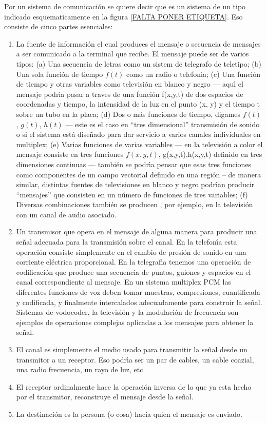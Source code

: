 Por un sistema de comunicaci\'{o}n se quiere decir que es un sistema
de un tipo indicado esquematicamente en la figura \ref{FALTA PONER
ETIQUETA}. Eso consiste de cinco partes esenciales:
\begin{enumerate}
\item{La fuente de informaci\'{o}n el cual produces el mensaje o secuencia de
mensajes a ser comunicado a la terminal que recibe. El mensaje puede
ser de varios tipos: (a) Una secuencia de letras como un sistem de
telegrafo de teletipo; (b) Una sola funci\'{o}n de tiempo $f(t)$ como
un radio o telefon\'{\i}a; (c) Una funci\'{o}n de tiempo y otras
variables como televisi\'{o}n en blanco y negro --- aqu\'{\i} el
mensaje podr\'{\i}a pasar a traves de una funci\'{o}n f(x,y,t) de dos
espacios de coordenadas y tiempo, la intensidad de la luz en el punto
(x, y) y el tiempo t sobre un tubo en la placa; (d) Dos o m\'{a}s
funciones de tiempo, digames $f(t)$, $g(t)$, $h(t)$ --- este es el
caso en ``tres dimensional'' transmisi\'{o}n de sonido o si el sistema
est\'{a} dise\~{n}ado para dar servicio a varios canales individuales
en multiplex; (e) Varias funciones de varias variables --- en la
televisi\'{o}n a color el mensaje consiste en tres funciones $f(x,y,t)$,
g(x,y,t),h(x,y,t) definido en tres dimensiones continuas --- tambi\'{e}n se
podr\'{\i}a pensar que esas tres funciones como componentes de un
campo vectorial definido en una regi\'{o}n -- de manera similar,
distintas fuentes de televisiones en blanco y negro podr\'{\i}an
producir ``mensajes'' que consisten en un n\'{u}mero de funciones de
tres variables; (f) Diversas combinaciones tambi\'{e}n se producen , por
ejemplo, en la televisi\'{o}n con un canal de audio asociado.}
\item{Un transmisor que opera en el mensaje de alguna manera para
producir una se\~{n}al adecuada para la transmisi\'{o}n sobre el
canal. En la telefon\'{\i}a esta operaci\'{o}n consiste simplemente en
el cambio de presi\'{o}n de sonido en una corriente el\'{e}ctrica
proporcional. En la telegraf\'{\i}a tenemos una operaci\'{o}n de
codificaci\'{o}n que produce una secuencia de puntos, guiones y
espacios en el canal correspondiente al mensaje. En un sistema
multiplex PCM las diferentes funciones de voz deben tomar muestras,
compresiones, cuantificada y codificada, y finalmente intercalados
adecuadamente para construir la se\~{n}al. Sistemas de vodocoder, la
televisi\'{o}n y la modulaci\'{o}n de frecuencia son ejemplos de
operaciones complejas aplicadas a los mensajes para obtener la
se\~{n}al.}
\item{El canal es simplemente el medio usado para transmitir la se\~{n}al
desde un transmitor a un receptor. Eso podr\'{\i}a ser un par de
cables, un cable coazial, una radio frecuencia, un rayo de luz, etc.}
\item{El receptor ordinalmente hace la operaci\'{o}n inversa de lo que ya
esta hecho por el transmitor, reconstruye el mensaje desde la se\~{n}al.}
\item{La destinaci\'{o}n es la persona (o cosa) hacia quien el mensaje es
enviado.}
\end{enumerate}

